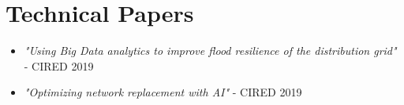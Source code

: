 \documentclass[letterpaper]{twentysecondcv} %
\begin{document}
\section{Technical Papers}

\begin{itemize}
        \item \textit{"Using Big Data analytics to improve flood resilience of the distribution grid"} - CIRED 2019
        \item \textit{"Optimizing network replacement with AI"} - CIRED 2019
\end{itemize}

%
\end{document}

